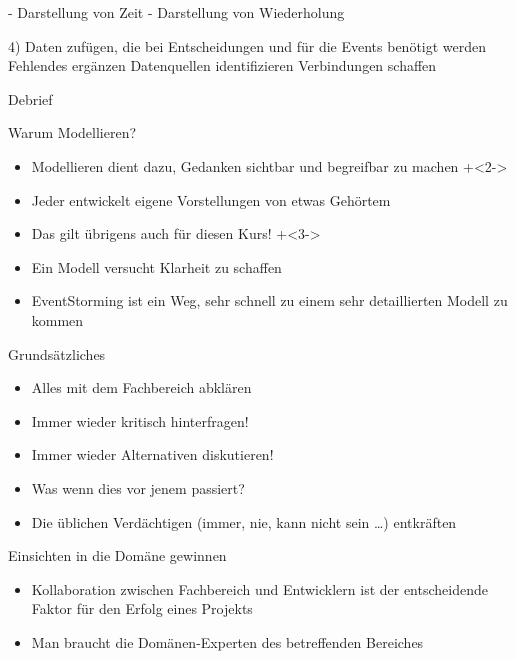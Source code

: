 - Darstellung von Zeit
- Darstellung von Wiederholung

4) Daten zufügen, die bei Entscheidungen und für die Events benötigt werden
Fehlendes ergänzen
Datenquellen identifizieren
Verbindungen schaffen


Debrief

\begin{frame}[fragile]{Warum Modellieren?}

\begin{itemize}
\item Modellieren dient dazu, Gedanken sichtbar und \glqq begreifbar\grqq{} zu machen
\onslide+<2->
\item Jeder entwickelt eigene Vorstellungen von etwas Gehörtem
\item Das gilt übrigens auch für diesen Kurs!
\onslide+<3->
\item Ein Modell versucht Klarheit zu schaffen
\item EventStorming ist ein Weg, sehr schnell zu einem sehr detaillierten Modell zu kommen
\end{itemize}

\end{frame}

\begin{frame}[fragile]{Grundsätzliches}

\begin{itemize}
\item Alles mit dem Fachbereich abklären
\item Immer wieder kritisch hinterfragen!
\item Immer wieder Alternativen diskutieren!
\item \glqq Was wenn dies vor jenem passiert?\grqq
\item Die üblichen Verdächtigen (\glqq immer\grqq, \glqq nie\grqq, \glqq kann nicht sein\grqq{} \ldots) entkräften
\end{itemize}

\end{frame}

\begin{frame}[fragile]{Einsichten in die Domäne gewinnen}
\begin{itemize}
\item Kollaboration zwischen Fachbereich und Entwicklern ist der entscheidende Faktor für den Erfolg eines Projekts
\item Man braucht die Domänen-Experten des betreffenden Bereiches
\end{itemize}

\end{frame}


